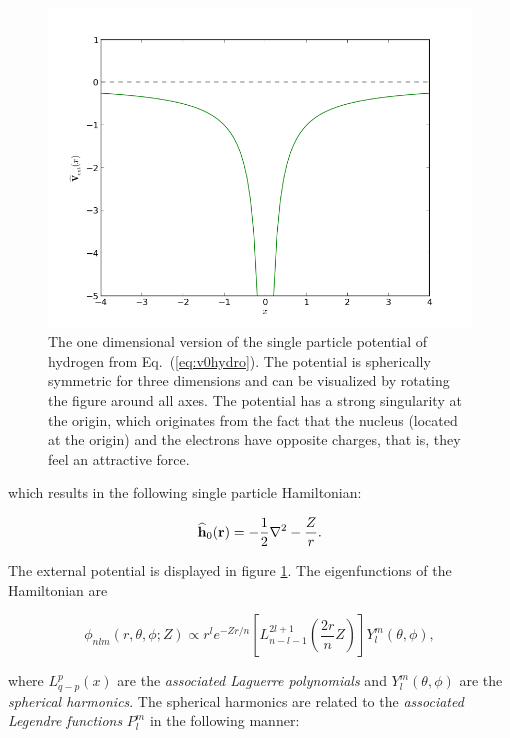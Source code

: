 \begin{figure}
 \begin{center}
  \includegraphics[scale=0.5]{../Graphics/Potentials/hydrogen.png}
  \caption{The one dimensional version of the single particle potential of hydrogen from Eq.~(\ref{eq:v0hydro}). The potential is spherically symmetric for three dimensions and can be visualized by rotating the figure around all axes. The potential has a strong singularity at the origin, which originates from the fact that the nucleus (located at the origin) and the electrons have opposite charges, that is, they feel an attractive force.}
  \label{fig:extPotHydrogen}
 \end{center}
\end{figure}

which results in the following single particle Hamiltonian:

\begin{equation}
 {\bf\widehat{h}}_0(\mathbf{r}) = -\frac{1}{2}\nabla^2 - \frac{Z}{r}.
\end{equation}

The external potential is displayed in figure \ref{fig:extPotHydrogen}. The eigenfunctions of the Hamiltonian are \cite{griffiths}

\begin{equation}
 \phi_{nlm}(r, \theta, \phi; Z) \propto r^l e^{-Zr/n}\left[L_{n-l-1}^{2l+1}\left(\frac{2r}{n}Z\right)\right] Y_l^m(\theta, \phi), \label{eq:hydrogenBasisComplex}
\end{equation}

where $L_{q-p}^p(x)$ are the \textit{associated Laguerre polynomials} and $Y_l^m(\theta, \phi)$ are the \textit{spherical harmonics}. The spherical harmonics are related to the \textit{associated Legendre functions} $P_l^m$ in the following manner:

